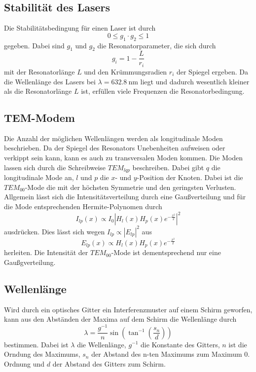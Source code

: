 \subsection{Stabilität des Lasers}
\label{sec:Stabilitaet}
Die Stabilitätsbedingung für einen Laser ist durch
\begin{equation}
    \label{eq:stabil}
    0 \leq g_1 \cdot g_2 \leq 1
\end{equation}
gegeben. Dabei sind $g_1$ und $g_2$ die Resonatorparameter, die sich durch
\begin{equation}
    \label{eq:param}
    g_i = 1 - \frac{L}{r_i}
\end{equation}
mit der Resonatorlänge $L$ und den Krümmungsradien $r_i$ der Spiegel ergeben. Da die Wellenlänge des Lasers
bei $\lambda = \SI{632,8}{\nano\meter}$ liegt und dadurch wesentlich kleiner als die Resonatorlänge $L$ ist,
erfüllen viele Frequenzen die Resonatorbedingung.

\subsection{TEM-Modem}
\label{sec:Moden}
Die Anzahl der möglichen Wellenlängen werden als longitudinale Moden beschrieben. Da der Spiegel des Resonators
Unebenheiten aufweisen oder verkippt sein kann, kann es auch zu transversalen Moden kommen. Die Moden lassen sich
durch die Schreibweise $TEM_{lqp}$ beschreiben. Dabei gibt $q$ die longitudinale Mode an, $l$ und $p$ die $x$-
und $y$-Position der Knoten. Dabei ist die $TEM_{00}$-Mode die mit der höchsten Symmetrie und den geringsten
Verlusten. Allgemein lässt sich die Intensitätsverteilung durch eine Gaußverteilung und für die Mode entsprechenden
Hermite-Polynomen durch
\begin{equation}
    I_{lp}(x) \propto I_0 |H_{l}(x)H_{p}(x)e^{-\frac{x^2}{2}}|^2
\end{equation}
ausdrücken. Dies lässt sich wegen $I_{lp} \propto |E_{lp}|^2$ aus
\begin{equation}
    E_{lp}(x) \propto H_{l}(x)H_{p}(x)e^{-\frac{x^2}{2}}
\end{equation}
herleiten. Die Intensität der $TEM_{00}$-Mode ist dementsprechend nur eine Gaußgverteilung.

\subsection{Wellenlänge}
\label{sec:Wellenlaenge}
Wird durch ein optisches Gitter ein Interferenzmuster auf einem Schirm geworfen, kann aus den Abständen der
Maxima auf dem Schirm die Wellenlänge durch
\begin{equation}
    \label{eq:winkel}
    \lambda = \frac{g^{-1}}{n} \sin\left(\tan^{-1}\left(\frac{s_n}{d}\right)\right)
\end{equation}
bestimmen. Dabei ist $\lambda$ die Wellenlänge, $g^{-1}$ die Konstante des Gitters, $n$ ist die Orndung des
Maximums, $s_n$ der Abstand des n-ten Maximums zum Maximum 0. Ordnung und $d$ der Abstand des Gitters zum
Schirm.